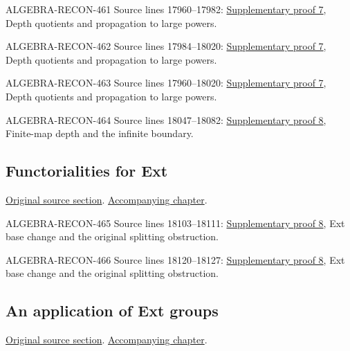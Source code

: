 \begin{AlgebraSourceRoutes}
\item[ALGEBRA-RECON-461] Source lines 17960--17982: \hyperlink{algebra_blowup_ext_depth_notes_20260927}{Supplementary proof 7}, Depth quotients and propagation to large powers.
\item[ALGEBRA-RECON-462] Source lines 17984--18020: \hyperlink{algebra_blowup_ext_depth_notes_20260927}{Supplementary proof 7}, Depth quotients and propagation to large powers.
\item[ALGEBRA-RECON-463] Source lines 17960--18020: \hyperlink{algebra_blowup_ext_depth_notes_20260927}{Supplementary proof 7}, Depth quotients and propagation to large powers.
\item[ALGEBRA-RECON-464] Source lines 18047--18082: \hyperlink{algebra_depth_tor_projective_notes_20260927}{Supplementary proof 8}, Finite-map depth and the infinite boundary.
\end{AlgebraSourceRoutes}

\subsection{Functorialities for Ext}
\hypertarget{algebra-source-section-functoriality-ext}{}
\noindent\href{https://github.com/stacks/stacks-project/blob/a04446e57ec1fbc252a871afcec7752fb2807b14/algebra.tex\#L18087}{Original source section}. \href{algebra.pdf\#nameddest=section-functoriality-ext}{Accompanying chapter}.

\begin{AlgebraSourceRoutes}
\item[ALGEBRA-RECON-465] Source lines 18103--18111: \hyperlink{algebra_depth_tor_projective_notes_20260927}{Supplementary proof 8}, Ext base change and the original splitting obstruction.
\item[ALGEBRA-RECON-466] Source lines 18120--18127: \hyperlink{algebra_depth_tor_projective_notes_20260927}{Supplementary proof 8}, Ext base change and the original splitting obstruction.
\end{AlgebraSourceRoutes}

\subsection{An application of Ext groups}
\hypertarget{algebra-source-section-ext-application}{}
\noindent\href{https://github.com/stacks/stacks-project/blob/a04446e57ec1fbc252a871afcec7752fb2807b14/algebra.tex\#L18135}{Original source section}. \href{algebra.pdf\#nameddest=section-ext-application}{Accompanying chapter}.

